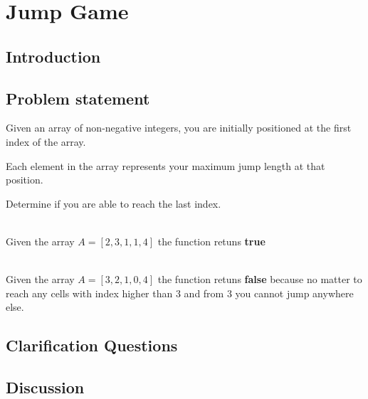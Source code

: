 %

\chapter{Jump Game}
\label{ch:can_jump}
\section*{Introduction}

\section{Problem statement}
\begin{exercise}
Given an array of non-negative integers, you are initially positioned at the first index of the array.

Each element in the array represents your maximum jump length at that position.

Determine if you are able to reach the last index.


	\begin{example}
		\hfill \\
		Given the array $A=[2,3,1,1,4]$ the function retuns \textbf{true}
	\end{example}

	\begin{example}
		\hfill \\
		Given the array $A=[3,2,1,0,4]$ the function retuns \textbf{false} because no matter to reach any cells with index higher than $3$ and from $3$ you cannot jump anywhere else.
		
	\end{example}
\end{exercise}

\section{Clarification Questions}

\begin{QandA}
	\item 
	\begin{answered}
		\textit{}
	\end{answered}
	
\end{QandA}

\section{Discussion}
\label{can_jump:sec:discussion}


